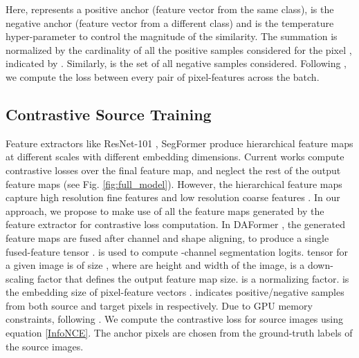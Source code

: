 \documentclass{article}
\begin{document}
Here,  represents a positive anchor (feature vector from the same class),  is the negative anchor (feature vector from a different class) and  is the temperature hyper-parameter to control the magnitude of the similarity. The summation is normalized by the cardinality of all the positive samples considered for the pixel , indicated by . Similarly,  is the set of all negative samples considered. 
Following \cite{wang2021exploring, zhao2021contrastive}, we compute the loss between every pair of pixel-features  across the batch.


\subsection{Contrastive Source Training}\label{sec:Contrastive Source Training}
Feature extractors like ResNet-101 \cite{he2016deep}, SegFormer \cite{xie2021segformer} produce hierarchical feature maps at different scales with different embedding dimensions. Current works compute contrastive losses over the final feature map, and neglect the rest of the output feature maps (see Fig. \ref{fig:full_model}). However, the hierarchical feature maps capture high resolution fine features and low resolution coarse features \cite{xie2021segformer, he2016deep}. In our approach, we propose to make use of all the feature maps generated by the feature extractor for contrastive loss computation. In DAFormer \cite{hoyer2021daformer},
the generated feature maps are fused after channel and shape aligning, to produce a single fused-feature tensor .  is used to compute -channel segmentation logits.  tensor for a given image is of size , where  are height and width of the image,  is a down-scaling factor that defines the output feature map size.  is a normalizing factor.  is the embedding size of pixel-feature vectors .   indicates positive/negative samples from both source and target pixels in  respectively. Due to GPU memory constraints, following \cite{zhao2021contrastive}. We compute the contrastive loss for source images using equation \ref{InfoNCE}. The anchor pixels are chosen from the ground-truth labels of the source images.
\end{document}
